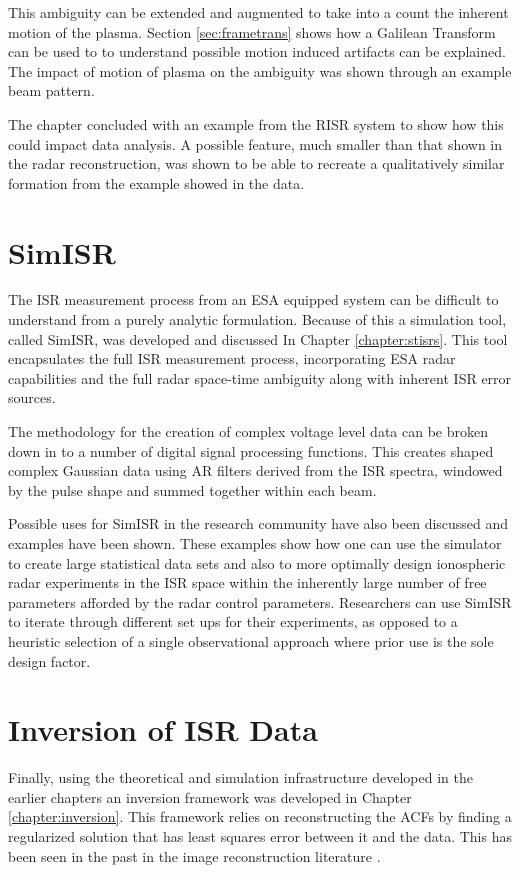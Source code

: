 This ambiguity can be extended and augmented to take into a count the inherent motion of the plasma. Section \ref{sec:frametrans} shows how a Galilean Transform can be used to to understand possible motion induced artifacts can be explained. The impact of motion of plasma on the ambiguity was shown through an example beam pattern.

The chapter concluded with an example from the RISR system to show how this could impact data analysis. A possible feature,  much smaller than that shown in the radar reconstruction, was shown to be able to recreate a qualitatively similar formation from the example showed in the data. 
  
\section{SimISR}


The ISR measurement process from an ESA equipped system can be difficult to understand from a purely analytic formulation. Because of this a simulation tool, called SimISR, was developed and discussed In Chapter \ref{chapter:stisrs}. This tool encapsulates the full ISR measurement process, incorporating ESA radar capabilities and the full radar space-time ambiguity along with inherent ISR error sources. 

The methodology for the creation of complex voltage level data can be broken down in to a number of digital signal processing functions. This creates shaped complex Gaussian data using AR filters derived from the ISR spectra, windowed by the pulse shape and summed together within each beam.  

Possible uses for SimISR in the research community have also been discussed and examples have been shown. These examples show how one can use the simulator to create large statistical data sets and also to more optimally design ionospheric radar experiments in the ISR space within the inherently large number of free parameters afforded by the radar control parameters. Researchers can use SimISR to iterate through different set ups for their experiments, as opposed to a heuristic selection of a single observational approach where prior use is the sole design factor. 
 
\section{Inversion of ISR Data}


Finally, using the theoretical and simulation infrastructure developed in the earlier chapters an inversion framework was developed in Chapter \ref{chapter:inversion}. This framework relies on reconstructing the ACFs by finding a regularized solution that has least squares error between it and the data. This has been seen in the past in the image reconstruction literature \cite{Karl:2005jy}.

